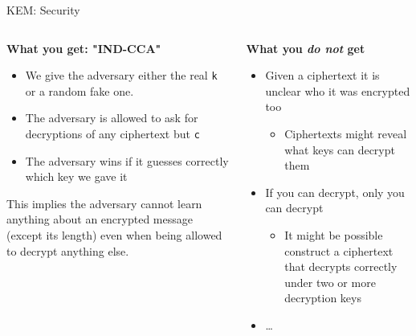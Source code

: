 \documentclass[xcolor=table,10pt,aspectratio=169]{beamer}
\begin{document}
\begin{frame}[label={sec:org81699ff},fragile]{KEM: Security}
 \begin{columns}[t]
\begin{column}{0.5\columnwidth}
\textbf{What you get: "IND-CCA"}

\begin{itemize}
\item We give the adversary either the real \texttt{k} or a random fake one.
\item The adversary is allowed to ask for decryptions of \alert{any} ciphertext but \texttt{c}
\item The adversary wins if it guesses correctly which key we gave it
\end{itemize}

This implies the adversary cannot learn anything about an encrypted message (except its length) even when being allowed to decrypt anything else.
\end{column}

\begin{column}{0.5\columnwidth}
\textbf{What you \emph{do not} get}

\begin{itemize}
\item Given a ciphertext it is unclear who it was encrypted too
\begin{itemize}
\item Ciphertexts might reveal what keys can decrypt them
\end{itemize}
\item If you can decrypt, only you can decrypt
\begin{itemize}
\item It might be possible construct a ciphertext that decrypts correctly under two or more decryption keys
\end{itemize}
\item …
\end{itemize}
\end{column}
\end{columns}
\end{frame}
\end{document}

